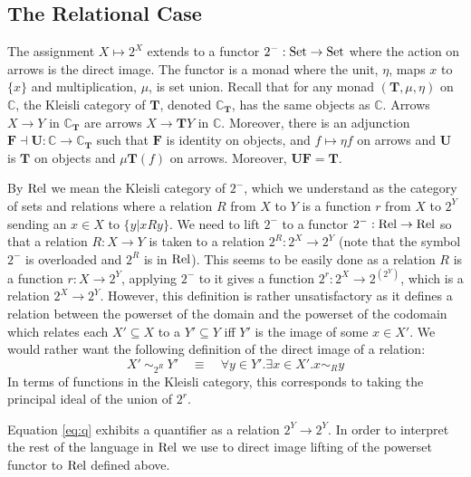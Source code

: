 \subsection{The Relational Case}
The assignment $X \mapsto 2^X$ extends to a functor $2^- : \mathrm{Set} \to
\mathrm{Set}$ where the action on arrows is the direct image. The functor is a
monad where the unit, $\eta$, maps $x$ to $\{x\}$ and multiplication,
$\mu$, is set union. Recall \cite{CWM} that for any monad
$(\mathbf{T}, \mu, \eta)$ on $\mathbb{C}$, the Kleisli category of
$\mathbf{T}$, denoted $\mathbb{C}_{\mathbf{T}}$, has the same objects
as $\mathbb{C}$. Arrows $X \to Y$ in $\mathbb{C}_{\mathbf{T}}$ are
arrows $X \to \mathbf{T}Y$ in $\mathbb{C}$. Moreover, there is an
adjunction $\mathbf{F} \dashv \mathbf{U} : \mathbb{C} \to
\mathbb{C}_\mathbf{T}$ such that $\mathbf{F}$ is identity on objects,
and $f \mapsto \eta f$ on arrows and $\mathbf{U}$ is $\mathbf{T}$ on
objects and $\mu \mathbf{T}(f)$ on arrows. Moreover,
$\mathbf{U}\mathbf{F} = \mathbf{T}$.

By $\mathrm{Rel}$ we mean the Kleisli category of $2^-$, which we
understand as the category of sets and relations where a relation $R$
from $X$ to $Y$ is a function $r$ from $X$ to $2^Y$ sending an $x \in
X$ to $\{ y | x R y \}$.
We need to lift $2^-$ to a functor $2^- : \mathrm{Rel} \to \mathrm{Rel}$
so that a relation $R : X \to Y$ is taken to a relation $2^R : 2^X \to
2^Y$ (note that the symbol $2^-$ is overloaded and $2^R$ is in
$\mathrm{Rel}$). This seems to be easily done as a relation $R$ is a function $r : X
\to 2^Y$, applying $2^-$ to it gives a function $2^r : 2^X \to
2^{(2^Y)}$, which is a relation $2^X \to 2^Y$. However, this
definition is rather unsatisfactory as it defines a
relation between the powerset of the domain and the powerset of the
codomain which relates each $X' \subseteq X$ to a $Y' \subseteq Y$ iff
$Y'$ is the image of some $x \in X'$. We would rather want the
following definition of the direct image of a relation:
%
\[
X' ~ \sim_{2^R} ~ Y' \quad \equiv \quad \forall y \in Y'.\exists x \in
X'. x \sim_R y \]
%
In terms of functions in the Kleisli category, this corresponds to
taking the principal ideal of the union of $2^r$. 


\renewcommand{\wp}[1]{2^{#1}} Equation \eqref{eq:q}  exhibits a
quantifier as a relation $\wp{Y} \to \wp{Y}$.  In order to interpret
the rest of the language in $\mathrm{Rel}$ we use to direct image lifting of the powerset
functor to $\mathrm{Rel}$ defined above.





